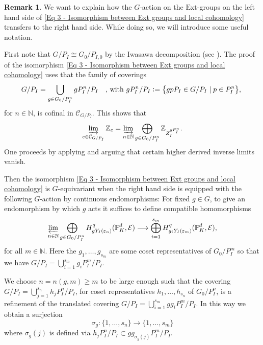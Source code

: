 \documentclass[a4paper, reqno, 10pt]{amsart}
\theoremstyle{definition}
\newtheorem{remark}[theorem]{Remark}
\numberwithin{equation}{section}
\newcommand{\defeq}{\vcentcolon=}
\newcommand{\Ext}{{\mathrm{Ext}}}
\newcommand{\lra}{\longrightarrow}
\newcommand{\BN}{{\mathbb {N}}}
\newcommand{\BP}{{\mathbb {P}}}
\newcommand{\BZ}{{\mathbb {Z}}}
\newcommand{\CC}{{\mathcal {C}}}
\newcommand{\CE}{{\mathcal {E}}}
\begin{document}
\begin{remark}\label{Rmk 3 - G-action on terms of spectral sequence}
	We want to explain how the $G$-action on the $\Ext$-groups on the left hand side of \eqref{Eq 3 - Isomorphism between Ext groups and local cohomology} transfers to the right hand side.
	While doing so, we will introduce some useful notation.
	
	First note that $G/P_I \cong G_0/P_{I,0}$ by the Iwasawa decomposition (see \cite[\S 3.5]{Cartier79ReppAdicGrpsSurvey}).
	The proof of the isomorphism \eqref{Eq 3 - Isomorphism between Ext groups and local cohomology} uses that the family of coverings
	\begin{equation*}
		G/P_I  = \bigcup_{g \in G_0/P^n_I} gP_I^n/P_I \quad\text{, with $ gP_I^n/P_I \defeq  \big\{ gpP_I \in G/P_I \mid p \in P^n_I \big\}$, }
	\end{equation*}
	for $n\in \BN$, is cofinal in $\CC_{G/P_I}$.
	This shows that 
	\begin{equation*}
		\varinjlim_{c\in \CC_{G/P_I}} \BZ_c  = \varinjlim_{n\in \BN} \bigoplus_{g \in G_0/P_I^n} \BZ_{Z_I^{gP^n_I}} .
	\end{equation*}
	One proceeds by applying \cite[Prop.\ 2.3 bis.]{Grothendieck68SGA2} and arguing that certain higher derived inverse limits vanish.
	
	
	Then the isomorphism \eqref{Eq 3 - Isomorphism between Ext groups and local cohomology} is $G$-equivariant when the right hand side is equipped with the following $G$-action by continuous endomorphisms:
	For fixed $g\in G$, to give an endomorphism by which $g$ acts it suffices to define compatible homomorphisms
	\begin{equation}\label{Eq 3 - Homomorphism of group action for inverse limit of cohomology groups}
		\varprojlim_{n\in \BN} \bigoplus_{g \in G_0/P_I^n} H^q_{g Y_I(\varepsilon_n)} (\BP_K^d, \CE) \lra \bigoplus_{i=1}^{s_m} H^q_{g_i Y_I(\varepsilon_m)} (\BP_K^d, \CE) ,
	\end{equation}
	for all $m \in \BN$.
	Here the $g_1,\ldots,g_{s_m}$ are some coset representatives of $G_0/P_I^m$ so that we have $G/P_I = \bigcup_{i=1}^{s_m} g_i P_{I}^m/P_I$.
	
	
	We choose $n=n(g,m) \geq m$ to be large enough such that the covering $G/P_I = \bigcup_{j=1}^{s_n} h_j P^n_I/P_I$, for coset representatives $h_1,\ldots,h_{s_n}$ of $G_0/P^n_I$, is a refinement of the translated covering $G/P_I = \bigcup_{i=1}^{s_m} g g_i P^m_I/P_I$.
	In this way we obtain a surjection
	\begin{equation*}
		\sigma_g \colon \{1,\ldots, s_{n}\} \lra \{ 1, \ldots, s_m \}
	\end{equation*}
	where $\sigma_g(j)$ is defined via $h_j P^{n}_I/P_I \subset g g_{\sigma_g(j)} P^m_I /P_I$.
	

\end{remark}
\end{document}
